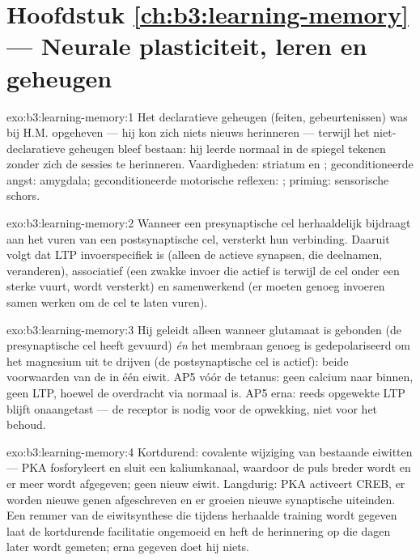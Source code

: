 \section*{Hoofdstuk \ref{ch:b3:learning-memory} --- Neurale plasticiteit, leren en geheugen}

\begin{solution}{exo:b3:learning-memory:1}
Het declaratieve geheugen (feiten, gebeurtenissen) was bij H.M.
opgeheven --- hij kon zich niets nieuws herinneren --- terwijl het
niet-declaratieve geheugen bleef bestaan: hij leerde normaal in de
spiegel tekenen zonder zich de sessies te herinneren. Vaardigheden:
striatum en ; geconditioneerde angst: amygdala;
geconditioneerde motorische reflexen: ; priming:
sensorische schors.
\end{solution}

\begin{solution}{exo:b3:learning-memory:2}
Wanneer een presynaptische cel herhaaldelijk bijdraagt aan het vuren
van een postsynaptische cel, versterkt hun verbinding. Daaruit volgt
dat LTP invoerspecifiek is (alleen de actieve synapsen, die deelnamen,
veranderen), associatief (een zwakke invoer die actief is terwijl de
cel onder een sterke vuurt, wordt versterkt) en samenwerkend (er moeten
genoeg invoeren samen werken om de cel te laten vuren).
\end{solution}

\begin{solution}{exo:b3:learning-memory:3}
Hij geleidt alleen wanneer glutamaat is gebonden (de presynaptische cel
heeft gevuurd) \emph{én} het membraan genoeg is gedepolariseerd om het
magnesium uit te drijven (de postsynaptische cel is actief): beide
voorwaarden van de  in één eiwit. AP5 vóór de tetanus:
geen calcium naar binnen, geen LTP, hoewel de overdracht via
 normaal is. AP5 erna: reeds opgewekte LTP blijft
onaangetast --- de receptor is nodig voor de opwekking, niet voor het
behoud.
\end{solution}

\begin{solution}{exo:b3:learning-memory:4}
Kortdurend: covalente wijziging van bestaande eiwitten --- PKA
fosforyleert en sluit een kaliumkanaal, waardoor de puls breder wordt
en er meer wordt afgegeven; geen nieuw eiwit. Langdurig: PKA activeert
CREB, er worden nieuwe genen afgeschreven en er groeien nieuwe
synaptische uiteinden. Een remmer van de eiwitsynthese die tijdens
herhaalde training wordt gegeven laat de kortdurende facilitatie
ongemoeid en heft de herinnering op die dagen later wordt gemeten; erna
gegeven doet hij niets.
\end{solution}

